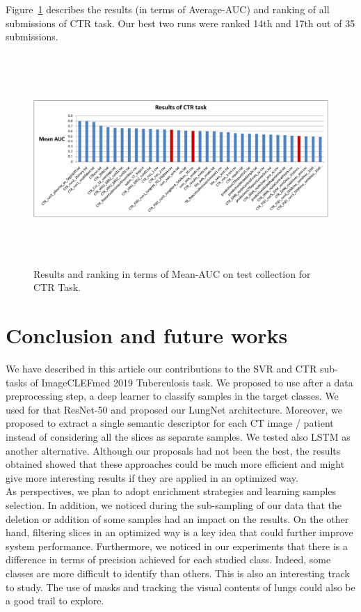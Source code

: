 \documentclass{llncs}
\begin{document}
Figure~\ref{fig:ctrresultsauc} describes the results (in terms of Average-AUC) and ranking of all submissions of CTR task. Our best two runs were ranked 14th and 17th out of 35 submissions.\\

\begin{figure}[!ht]
\includegraphics[width=12cm,height=8cm]{results_ctr_test_meanauc.pdf}
\caption{Results and ranking in terms of Mean-AUC on test collection for CTR Task.} 
\label{fig:ctrresultsauc}
\end{figure}


\section{Conclusion and future works}

We have described in this article our contributions to the SVR and CTR sub-tasks of ImageCLEFmed 2019 Tuberculosis task. We proposed to use after a data preprocessing step, a deep learner to classify samples in the target classes. We used for that ResNet-50 and proposed our LungNet architecture. Moreover, we proposed to extract a single semantic descriptor for each CT image / patient instead of considering all the slices as separate samples. We tested also LSTM as another alternative. Although our proposals had not been the best, the results obtained showed that these approaches could be much more efficient and might give more interesting results if they are applied in an optimized way.\\

As perspectives, we plan to adopt enrichment strategies and learning samples selection. In addition, we noticed during the sub-sampling of our data that the deletion or addition of some samples had an impact on the results. On the other hand, filtering slices in an optimized way is a key idea that could further improve system performance. Furthermore, we noticed in our experiments that there is a difference in terms of precision achieved for each studied class. Indeed, some classes are more difficult to identify than others. This is also an interesting track to study. The use of masks and tracking the visual contents of lungs could also be a good trail to explore.


\end{document}
